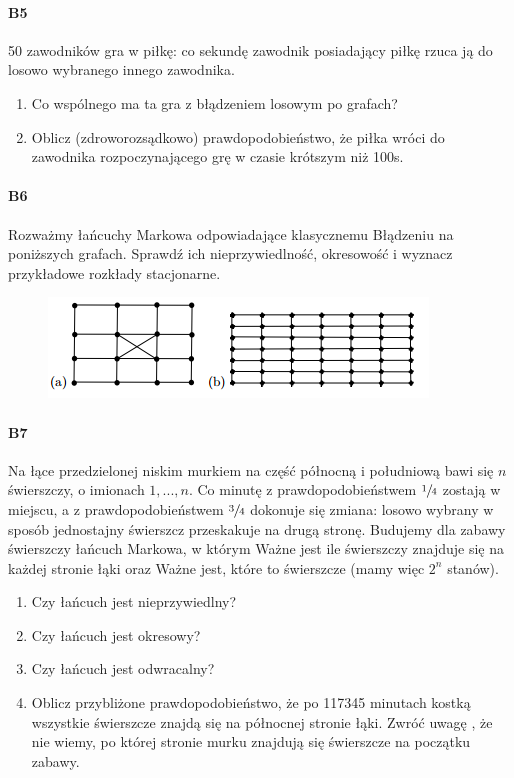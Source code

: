 \paragraph{B5} 50 zawodników gra w piłkę: co sekundę zawodnik posiadający piłkę rzuca ją do losowo wybranego innego zawodnika.
\begin{enumerate}[label=\alph*)]
\item Co wspólnego ma ta gra z błądzeniem losowym po grafach?
\item Oblicz (zdroworozsądkowo) prawdopodobieństwo, że piłka wróci do zawodnika rozpoczynającego grę w czasie krótszym niż 100s.
\end{enumerate}

\paragraph{B6} Rozważmy łańcuchy Markowa odpowiadające klasycznemu Błądzeniu na poniższych grafach. Sprawdź ich nieprzywiedlność, okresowość i wyznacz przykładowe rozkłady stacjonarne.
\begin{figure}[H]
\centering
\includegraphics[width=.9\textwidth]{img/9_B6}
\end{figure}

\paragraph{B7} Na łące przedzielonej niskim murkiem na część północną i południową bawi się $n$ świerszczy, o imionach $1, . . . , n$. Co minutę z prawdopodobieństwem $\sfrac{1}{4}$ zostają w miejscu, a z prawdopodobieństwem $\sfrac{3}{4}$ dokonuje się zmiana: losowo wybrany w sposób jednostajny świerszcz przeskakuje na drugą stronę. Budujemy dla zabawy świerszczy łańcuch Markowa, w którym Ważne jest ile świerszczy znajduje się na każdej stronie łąki oraz Ważne jest, które to świerszcze (mamy więc $2^n$ stanów).
\begin{enumerate}[label=\alph*)]
\item Czy łańcuch jest nieprzywiedlny?
\item Czy łańcuch jest okresowy?
\item Czy łańcuch jest odwracalny?
\item Oblicz przybliżone prawdopodobieństwo, że po 117345 minutach kostką wszystkie świerszcze znajdą się na północnej stronie łąki. Zwróć uwagę , że nie wiemy, po której stronie murku znajdują się świerszcze na początku zabawy.
\end{enumerate}

